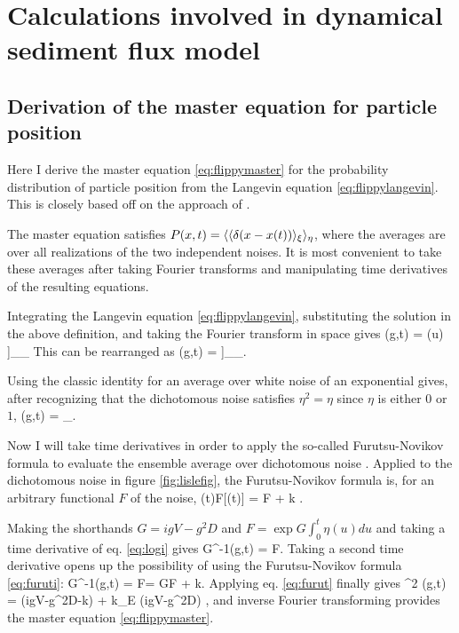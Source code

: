 
\chapter{Calculations involved in dynamical sediment flux model}
\label{sec:appendixA}
\section{Derivation of the master equation for particle position}
\label{sec:appAmaster}
Here I derive the master equation \ref{eq:flippymaster} for the probability distribution of particle position from the Langevin equation \ref{eq:flippylangevin}. This is closely based off on the approach of \citet{Balakrishnan1993}.

The master equation satisfies $P(x,t) = \langle\langle \delta(x-x(t))\rangle_\xi \rangle_\eta$, where the averages are over all realizations of the two independent noises. It is most convenient to take these averages after taking Fourier transforms and manipulating time derivatives of the resulting equations.

Integrating the Langevin equation \ref{eq:flippylangevin}, substituting the solution in the above definition, and taking the Fourier transform in space gives
\be {}(g,t) = \Big\bra  \Big\bra \exp \Big[- i g \int_0^t du [V+\sqrt{2D}\xi(u)]\eta(u) \Big]\Big\ket_\eta \Big\ket_\xi\ee
This can be rearranged as
\be {}(g,t) = \Big\bra \exp{} \Big\bra \exp{}\Big]\Big\ket_\xi \Big\ket_\eta .\ee

Using the classic identity for an average over white noise of an exponential \citep{Balakrishnan1993,VanKampen2007} gives, after recognizing that the dichotomous noise satisfies $\eta^2 = \eta$ since $\eta$ is either $0$ or $1$,
\be {}(g,t) = \Big\bra \exp{}\Big\ket_\eta. \label{eq:logi}\ee

Now I will take time derivatives in order to apply the so-called Furutsu-Novikov formula to evaluate the ensemble average over dichotomous noise \citep{Shapiro1978}. Applied to the dichotomous noise in figure \ref{fig:lislefig}, the Furutsu-Novikov formula is, for an arbitrary functional $F$ of the noise,
\be \pt \bra \eta(t)F[\eta(t)] \ket = \bra \eta \pt F \ket + k   \label{eq:furuti}.\ee


Making the shorthands $G = igV-g^2D$ and $F=\exp G\int_0^t \eta(u)du$ and taking a time derivative of eq. \ref{eq:logi} gives
\be G^{-1}\pt {}(g,t) = \bra \eta F\ket. \label{eq:furut}\ee
Taking a second time derivative opens up the possibility of using the Furutsu-Novikov formula \ref{eq:furuti}: 
\be G^{-1}\pt {}(g,t) = \pt \bra \eta F\ket = G\bra \eta F \ket + k. \ee
Applying eq. \ref{eq:furut} finally gives
\be \pt^2 (g,t)  = (igV-g^2D-k)\pt  {} + k_E (igV-g^2D) ,\ee
and inverse Fourier transforming provides the master equation \ref{eq:flippymaster}.

